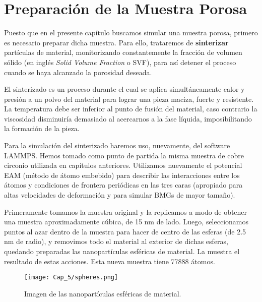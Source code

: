 
\section{Preparación de la Muestra Porosa}
\label{S5_3}

Puesto que en el presente capítulo buscamos simular una muestra porosa, primero es necesario preparar dicha muestra. Para ello,
trataremos de \textbf{sinterizar} partículas de material, monitorizando constantemente la fracción de volumen sólido (en inglés \textit{Solid Volume Fraction} o SVF), para así detener el proceso cuando se haya alcanzado la porosidad deseada.

El sinterizado es un proceso durante el cual se aplica simultáneamente calor y presión a un polvo
del material para lograr una pieza maciza, fuerte y resistente. La temperatura debe ser inferior al punto de fusión del material,
caso contrario la viscosidad disminuiría demasiado al acercarnos a la fase líquida, imposibilitando la formación de la pieza.

Para la simulación del sinterizado haremos uso, nuevamente, del software LAMMPS. Hemos tomado como punto de partida la misma muestra
de cobre circonio utilizada en capítulos anteriores. Utilizamos nuevamente el potencial EAM (método de átomo embebido) \citep{daw84}
para describir las interacciones entre los átomos y condiciones de frontera periódicas en las tres caras (apropiado para altas velocidades
de deformación \citep{bringa05} y para simular BMGs de mayor tamaño).

Primeramente tomamos la muestra original y la replicamos a modo de obtener una muestra aproximadamente cúbica, de 15 nm de lado. 
Luego, seleccionamos puntos
al azar dentro de la muestra para hacer de centro de las esferas (de 2.5 nm de radio), y removimos todo el material al exterior de dichas esferas,
quedando preparadas las nanopartículas esféricas de material. La  muestra el resultado de estas
acciones. Esta nueva muestra tiene 77888 átomos.

\begin{figure}[h!]
  \centering
  \texttt{[image: Cap\_5/spheres.png]}
  \caption[Nanopartículas esféricas de material para el sinterizado]{Imagen de las nanopartículas esféricas de material.}
  \label{C5:fg:sintInicial}
\end{figure}

